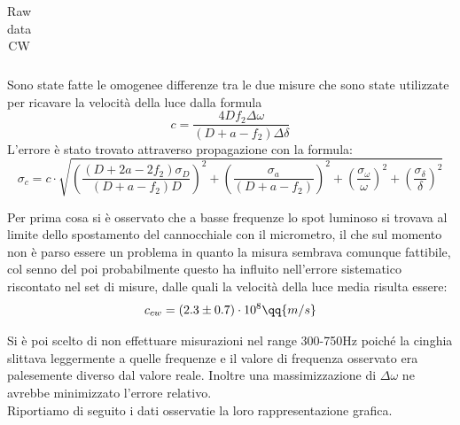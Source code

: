 \documentclass[openright]{article}
\begin{document}
\begin{table}
\begin{tabular}{ cccccccc }
            \bottomrule           
            \end{tabular}
        \caption{Raw data CW}
    \end{table}
    
    Sono state fatte le omogenee differenze tra le due misure che sono state utilizzate per ricavare la velocità della luce dalla formula 
    \[
    c= \frac{4Df_2\Delta\omega}{(D+a-f_2)\Delta\delta}
    \]
    L'errore è stato trovato attraverso propagazione con la formula: 
    \[
    \sigma_c= c\cdot \sqrt{(\frac{(D+2a-2f_2)\sigma_D}{(D+a-f_2)D})^2+(\frac{\sigma_a}{(D+a-f_2)})^2+(\frac{\sigma_\omega}{\omega})^2+(\frac{\sigma_\delta}{\delta})^2}
    \label{propagazione err luce}
    \]
    
    Per prima cosa si è osservato che a basse frequenze lo spot luminoso si trovava al limite dello spostamento del cannocchiale con il micrometro, il che sul momento non è parso essere un problema in quanto la misura sembrava comunque fattibile, col senno del poi probabilmente questo ha influito nell'errore sistematico riscontato nel set di misure, dalle quali la velocità della luce media risulta essere:    
    \[
    c_{cw} = (2.3 \pm 0.7)\cdot10^8 \qq {m/s}
    \] 

    Si è poi scelto di non effettuare misurazioni nel range 300-750Hz poiché la cinghia slittava leggermente a quelle frequenze e il valore di frequenza osservato era palesemente diverso dal valore reale. Inoltre una massimizzazione di $\Delta \omega$ ne avrebbe minimizzato l'errore relativo. \\
    
    Riportiamo di seguito i dati osservatie la loro rappresentazione grafica.
    
\end{document}
